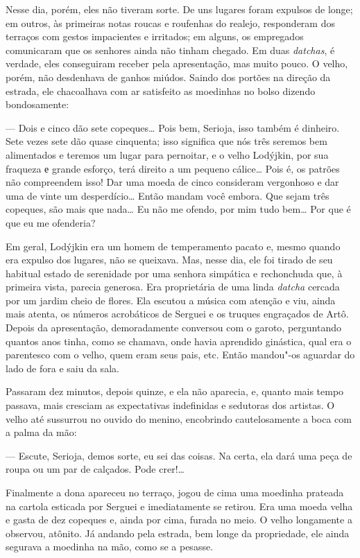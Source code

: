 Nesse dia, porém, eles não tiveram sorte. De uns lugares foram expulsos
de longe; em outros, às primeiras notas roucas e roufenhas do realejo,
responderam dos terraços com gestos impacientes e irritados; em alguns,
os empregados comunicaram que os senhores ainda não tinham chegado. Em
duas \emph{datchas}, é verdade, eles conseguiram receber pela
apresentação, mas muito pouco. O velho, porém, não desdenhava de ganhos
miúdos. Saindo dos portões na direção da estrada, ele chacoalhava com ar satisfeito as moedinhas no bolso dizendo bondosamente:

--- Dois e cinco dão sete copeques\ldots{} Pois bem, Serioja, isso também é
dinheiro. Sete vezes sete dão quase cinquenta; isso significa que nós
três seremos bem alimentados e teremos um lugar para pernoitar, e o
velho Lodýjkin, por sua fraqueza е grande esforço, terá direito a um
pequeno cálice\ldots{} Pois é, os patrões não compreendem isso! Dar uma moeda
de cinco consideram vergonhoso e dar uma de vinte um desperdício\ldots{}
Então mandam você embora. Que sejam três copeques, são mais que nada\ldots{}
Eu não me ofendo, por mim tudo bem\ldots{} Por que é que eu me ofenderia?

Em geral, Lodýjkin era um homem de temperamento pacato e, mesmo quando
era expulso dos lugares, não se queixava. Mas, nesse dia, ele foi tirado
de seu habitual estado de serenidade por uma senhora simpática e
rechonchuda que, à primeira vista, parecia generosa. Era proprietária de
uma linda \emph{datcha} cercada por um jardim cheio de flores. Ela
escutou a música com atenção e viu, ainda mais atenta, os números
acrobáticos de Serguei e os truques engraçados de Artô. Depois da
apresentação, demoradamente conversou com o garoto, perguntando quantos
anos tinha, como se chamava, onde havia aprendido ginástica, qual era o
parentesco com o velho, quem eram seus pais, etc. Então mandou"-os
aguardar do lado de fora e saiu da sala.

Passaram dez minutos, depois quinze, e ela não aparecia, e, quanto mais
tempo passava, mais cresciam as expectativas indefinidas e sedutoras dos
artistas. O velho até sussurrou no ouvido do menino, encobrindo
cautelosamente a boca com a palma da mão:

--- Escute, Serioja, demos sorte, eu sei das coisas. Na certa, ela dará
uma peça de roupa ou um par de calçados. Pode crer!\ldots{}

Finalmente a dona apareceu no terraço, jogou de cima uma moedinha
prateada na cartola esticada por Serguei e imediatamente se retirou. Era
uma moeda velha e gasta de dez copeques e, ainda por cima, furada no
meio. O velho longamente a observou, atônito. Já andando pela estrada,
bem longe da propriedade, ele ainda segurava a moedinha na mão, como se
a pesasse.

